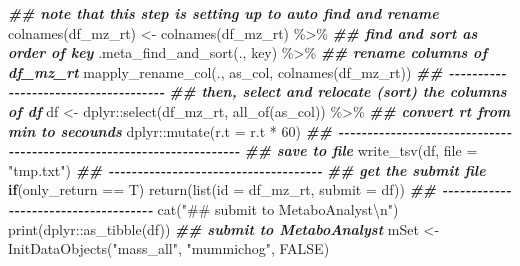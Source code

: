 \documentclass[
]{article}
\newenvironment{Shaded}{\begin{snugshade}}{\end{snugshade}}
\newcommand{\AttributeTok}[1]{\textcolor[rgb]{0.77,0.63,0.00}{#1}}
\newcommand{\ConstantTok}[1]{\textcolor[rgb]{0.00,0.00,0.00}{#1}}
\newcommand{\ControlFlowTok}[1]{\textcolor[rgb]{0.13,0.29,0.53}{\textbf{#1}}}
\newcommand{\DecValTok}[1]{\textcolor[rgb]{0.00,0.00,0.81}{#1}}
\newcommand{\DocumentationTok}[1]{\textcolor[rgb]{0.56,0.35,0.01}{\textbf{\textit{#1}}}}
\newcommand{\FunctionTok}[1]{\textcolor[rgb]{0.00,0.00,0.00}{#1}}
\newcommand{\NormalTok}[1]{#1}
\newcommand{\OtherTok}[1]{\textcolor[rgb]{0.56,0.35,0.01}{#1}}
\newcommand{\SpecialCharTok}[1]{\textcolor[rgb]{0.00,0.00,0.00}{#1}}
\newcommand{\StringTok}[1]{\textcolor[rgb]{0.31,0.60,0.02}{#1}}
\begin{document}
\begin{Shaded}
\begin{Highlighting}[]
    \DocumentationTok{\#\# note that this step is setting up to auto find and rename}
    \FunctionTok{colnames}\NormalTok{(df\_mz\_rt) }\OtherTok{\textless{}{-}} \FunctionTok{colnames}\NormalTok{(df\_mz\_rt) }\SpecialCharTok{\%\textgreater{}\%} 
      \DocumentationTok{\#\# find and sort as order of \textasciigrave{}key\textasciigrave{}}
      \FunctionTok{.meta\_find\_and\_sort}\NormalTok{(., key) }\SpecialCharTok{\%\textgreater{}\%} 
      \DocumentationTok{\#\# rename columns of df\_mz\_rt}
      \FunctionTok{mapply\_rename\_col}\NormalTok{(., as\_col, }\FunctionTok{colnames}\NormalTok{(df\_mz\_rt))}
    \DocumentationTok{\#\# {-}{-}{-}{-}{-}{-}{-}{-}{-}{-}{-}{-}{-}{-}{-}{-}{-}{-}{-}{-}{-}{-}{-}{-}{-}{-}{-}{-}{-}{-}{-}{-}{-}{-}{-}{-}{-} }
    \DocumentationTok{\#\# then, select and relocate (sort) the columns of df}
\NormalTok{    df }\OtherTok{\textless{}{-}}\NormalTok{ dplyr}\SpecialCharTok{::}\FunctionTok{select}\NormalTok{(df\_mz\_rt, }\FunctionTok{all\_of}\NormalTok{(as\_col)) }\SpecialCharTok{\%\textgreater{}\%} 
      \DocumentationTok{\#\# convert rt from min to secounds}
\NormalTok{      dplyr}\SpecialCharTok{::}\FunctionTok{mutate}\NormalTok{(}\AttributeTok{r.t =}\NormalTok{ r.t }\SpecialCharTok{*} \DecValTok{60}\NormalTok{)}
    \DocumentationTok{\#\# {-}{-}{-}{-}{-}{-}{-}{-}{-}{-}{-}{-}{-}{-}{-}{-}{-}{-}{-}{-}{-}{-}{-}{-}{-}{-}{-}{-}{-}{-}{-}{-}{-}{-}{-}{-}{-}{-}{-}{-}{-}{-}{-}{-}{-}{-}{-}{-}{-}{-}{-}{-}{-}{-}{-}{-}{-}{-}{-}{-}{-}{-}{-}{-}{-}{-}{-}{-}{-}{-} }
    \DocumentationTok{\#\# save to file}
    \FunctionTok{write\_tsv}\NormalTok{(df, }\AttributeTok{file =} \StringTok{"tmp.txt"}\NormalTok{)}
    \DocumentationTok{\#\# {-}{-}{-}{-}{-}{-}{-}{-}{-}{-}{-}{-}{-}{-}{-}{-}{-}{-}{-}{-}{-}{-}{-}{-}{-}{-}{-}{-}{-}{-}{-}{-}{-}{-}{-}{-}{-} }
    \DocumentationTok{\#\# get the submit file}
    \ControlFlowTok{if}\NormalTok{(only\_return }\SpecialCharTok{==}\NormalTok{ T)}
      \FunctionTok{return}\NormalTok{(}\FunctionTok{list}\NormalTok{(}\AttributeTok{id =}\NormalTok{ df\_mz\_rt, }\AttributeTok{submit =}\NormalTok{ df))}
    \DocumentationTok{\#\# {-}{-}{-}{-}{-}{-}{-}{-}{-}{-}{-}{-}{-}{-}{-}{-}{-}{-}{-}{-}{-}{-}{-}{-}{-}{-}{-}{-}{-}{-}{-}{-}{-}{-}{-}{-}{-} }
    \FunctionTok{cat}\NormalTok{(}\StringTok{"\#\# submit to MetaboAnalyst}\SpecialCharTok{\textbackslash{}n}\StringTok{"}\NormalTok{)}
    \FunctionTok{print}\NormalTok{(dplyr}\SpecialCharTok{::}\FunctionTok{as\_tibble}\NormalTok{(df))}
    \DocumentationTok{\#\# submit to MetaboAnalyst}
\NormalTok{    mSet }\OtherTok{\textless{}{-}} \FunctionTok{InitDataObjects}\NormalTok{(}\StringTok{"mass\_all"}\NormalTok{, }\StringTok{"mummichog"}\NormalTok{, }\ConstantTok{FALSE}\NormalTok{)}

\end{Highlighting}
\end{Shaded}
\end{document}

